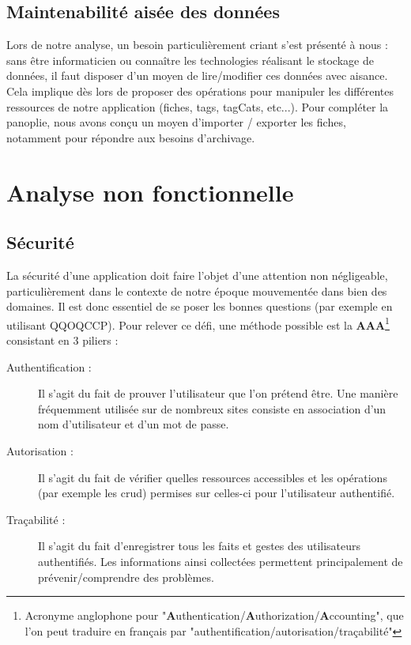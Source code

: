 \subsection*{Maintenabilité aisée des données}

Lors de notre analyse, un besoin particulièrement criant s'est présenté à nous : sans être informaticien ou connaître les technologies réalisant le stockage de données, il faut disposer d'un moyen de lire/modifier ces données avec aisance. \\

Cela implique dès lors de proposer des opérations pour manipuler les différentes ressources de notre application (\glspl{fiche}, \glspl{tag}, \glspl{tagCat}, etc...). Pour compléter la panoplie, nous avons conçu un moyen d'importer / exporter les \glspl{fiche}, notamment pour répondre aux besoins d'archivage.

\pagebreak


\section{Analyse non fonctionnelle}
\label{section:AnalyseNonFonctionnelle}

\subsection*{Sécurité}

La sécurité d'une application doit faire l'objet d'une attention non négligeable, particulièrement dans le contexte de notre époque mouvementée dans bien des domaines. Il est donc essentiel de se poser les bonnes questions (par exemple en utilisant \Gls{QQOQCCP}). Pour relever ce défi, une méthode possible est la \textbf{AAA}\footnote{Acronyme anglophone pour "\textbf{A}uthentication/\textbf{A}uthorization/\textbf{A}ccounting", que l'on peut traduire en français par "authentification/autorisation/traçabilité" }
consistant en 3 piliers : 

\begin{description}
    \item[Authentification :] Il s'agit du fait de prouver l'utilisateur que l'on prétend être. Une manière fréquemment utilisée sur de nombreux sites consiste en association d'un nom d'utilisateur et d'un mot de passe.
    \item[Autorisation :] Il s'agit du fait de vérifier quelles ressources accessibles et les opérations (par exemple les \Gls{crud}) permises sur celles-ci pour l'utilisateur authentifié.
    \item[Traçabilité :] Il s'agit du fait d'enregistrer tous les faits et gestes des utilisateurs authentifiés. Les informations ainsi collectées permettent principalement de prévenir/comprendre des problèmes. 
\end{description}

